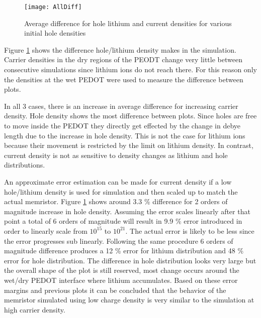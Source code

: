 \begin{doublespace}
\begin{figure}[!htp]
\centering
\texttt{[image: AllDiff]}
\caption{Average difference for hole lithium and current densities for various initial hole densities} 
\label{AllDiff}
\end{figure}

Figure \ref{AllDiff} shows the difference hole/lithium density makes in the simulation. Carrier densities in the dry regions of the PEODT change very little between consecutive simulations since lithium ions do not reach there. For this reason only the densities at the wet PEDOT were used to measure the difference between plots. 

In all 3 cases, there is an increase in average difference for increasing carrier density. Hole density shows the most difference between plots. Since holes are free to move inside the PEDOT they directly get effected by the change in debye length due to the increase in hole density. This is not the case for lithium ions because their movement is restricted by the limit on lithium density. In contrast, current density is not as sensitive to density changes as lithium and hole distributions.

 An approximate error estimation can be made for current density if a low hole/lithium density is used for simulation and then scaled up to match the actual memristor. Figure \ref{AllDiff} shows around 3.3 \% difference for 2 orders of magnitude increase in hole density. Assuming the error scales linearly after that point a total of 6 orders of magnitude will result in 9.9 \% error introduced in order to linearly scale from $10^{15}$ to $10^{21}$. The actual error is likely to be less since the error progresses sub linearly. Following the same procedure 6 orders of magnitude difference produces a 12 \% error for lithium distribution and 48 \% error for hole distribution. The difference in hole distribution looks very large but the overall shape of the plot is still reserved, most change occurs around the wet/dry PEDOT interface where lithium accumulates. Based on these error margins and previous plots it can be concluded that the behavior of the memristor simulated using low charge density is very similar to the simulation at high carrier density.    




\end{doublespace}
